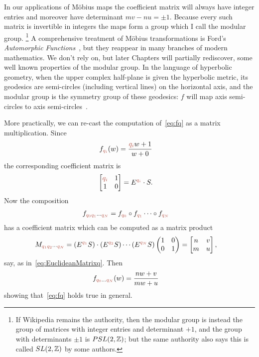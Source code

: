 In our applications of M\"obius maps the coefficient matrix will always have integer entries and moreover have determinant $mv-nu=\pm 1$. Because every such matrix is invertible in integers the maps form a group which I call the modular group.%
\footnote{If Wikipedia remains the authority, then the modular group is instead the group of matrices with integer entries and determinant $+1$, and the group with determinants $\pm 1$ is  $PSL(2,\mathbb{Z})$; but the same authority also says this is called $SL(2,\mathbb{Z})$ by some authors.}
A comprehensive treatment of M\"obius transformations is Ford's \textit{Automorphic Functions}~\cite{fordAutomorphicFunctions1951}, but they reappear in many branches of modern mathematics. 
We don't rely on, but later Chapters will partially rediscover, some well known properties of the modular group. In the language of hyperbolic geometry, when the upper complex half-plane is given the hyperbolic metric, its geodesics are semi-circles (including vertical lines) on the horizontal axis, and the modular group is the symmetry group of these geodesics: $f$ will map axis semi-circles to axis semi-circles~\cite{katokFuchsianGroups1992,schwartzMostlySurfaces2011}. 

More practically, we can re-cast the computation of~\ref{eq:fq} as a matrix multiplication. Since 
\begin{align}
		f_\jqix{i}(\wC)  &=\frac{\jqix{i} \wC+1}{\wC+0}
\end{align}
the corresponding coefficient matrix is 
\begin{align}
	\begin{bmatrix}
	\jqix{i} & 1 \\ 1 & 0	\end{bmatrix}
	 &=E^{\jqix{i}}\cdot S.
\end{align}
Now the composition
\begin{align}
	f_{\jqix{0}\jqix{1}\cdots\jqix{N}} &= 	f_{\jqix{0}}\circ f_{\jqix{1}}\cdots\circ f_{\jqix{N}}
\end{align}
has a coefficient matrix which can be computed as a matrix product
\begin{align}
	M_{\jqn{q_1}\jqn{q_2}\cdots\jqn{q_N}}
  &= 
	(E^{\jqn{q_1}} S )\cdot( E^{\jqn{q_2}} S ) \cdots  (E^{\jqn{q_N}} S)  \begin{pmatrix} 1&0  \\ 0&1 \end{pmatrix}	=	\begin{bmatrix} n & v \\ m & u \end{bmatrix}, 
\end{align}
say, as in~\eqref{eq:EuclideanMatrixq}. Then 
\begin{align}
	f_{\jqix{0}\ldots \jqix{N}}(\wC) &= \frac{n\wC+v}{m\wC+u} 
\end{align}
showing that~\eqref{eq:fq} holds true in general. 


